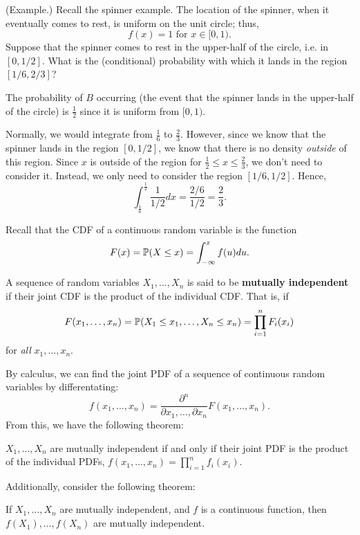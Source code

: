 \begin{mdframed}[]
    (Example.) Recall the spinner example. The location of the spinner, when it eventually comes to rest, is uniform on the unit circle; thus, 
    \[f(x) = 1 \text{ for } x \in [0, 1).\]
    Suppose that the spinner comes to rest in the upper-half of the circle, i.e. in $[0, 1/2]$. What is the (conditional) probability with which it lands in the region $[1/6, 2/3]$?

    \begin{mdframed}[]
        The probability of $B$ occurring (the event that the spinner lands in the upper-half of the circle) is $\frac{1}{2}$ since it is uniform from $[0, 1)$.

        \bigskip 

        Normally, we would integrate from $\frac{1}{6}$ to $\frac{2}{3}$. However, since we know that the spinner lands in the region $[0, 1/2]$, we know that there is no density \emph{outside} of this region. Since $x$ is outside of the region for $\frac{1}{2} \leq x \leq \frac{2}{3}$, we don't need to consider it. Instead, we only need to consider the region $[1/6, 1/2]$. Hence,
        \[\int_{\frac{1}{6}}^{\frac{1}{2}} \frac{1}{1/2} dx = \frac{2/6}{1/2} = \frac{2}{3}.\]
    \end{mdframed}
\end{mdframed}

Recall that the CDF of a continuous random variable is the function 
\[F(x) = \mathbb{P}(X \leq x) = \int_{-\infty}^{x} f(u) du.\]

\begin{definition}{}{}
    A sequence of random variables $X_1, \dots, X_n$ is said to be \textbf{mutually independent} if their joint CDF is the product of the individual CDF. That is, if 
    \[F(x_1, \dots, x_n) = \mathbb{P}(X_1 \leq x_1, \dots, X_n \leq x_n) = \prod_{i = 1}^{n} F_{i}(x_i)\]
    for \emph{all} $x_1, \dots, x_n$. 
\end{definition}
By calculus, we can find the joint PDF of a sequence of continuous random variables by differentating: 
\[f(x_1, \dots, x_n) = \frac{\partial^n}{\partial x_1, \dots, \partial x_n} F(x_1, \dots, x_n).\]
From this, we have the following theorem: 
\begin{theorem}{}{}
    $X_1, \dots, X_n$ are mutually independent if and only if their joint PDF is the product of the individual PDFs, $f(x_1, \dots, x_n) = \prod_{i = 1}^{n} f_{i}(x_i)$. 
\end{theorem}
Additionally, consider the following theorem: 
\begin{theorem}{}{}
    If $X_1, \dots, X_n$ are mutually independent, and $f$ is a continuous function, then $f(X_1), \dots, f(X_n)$ are mutually independent.
\end{theorem}

